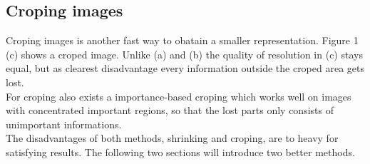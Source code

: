 \subsection{Croping images}
Croping images is another fast way to obatain a smaller representation. Figure 1 (c) shows a croped image. Unlike (a) and (b) the quality of resolution in (c) stays equal, but as clearest disadvantage every information outside the croped area gets lost. \\
For croping also exists a importance-based croping which works well on images with concentrated important regions, so that the lost parts only consists of unimportant informations.\\
The disadvantages of both methods, shrinking and croping, are to heavy for satisfying results. The following two sections will introduce two better methods.
